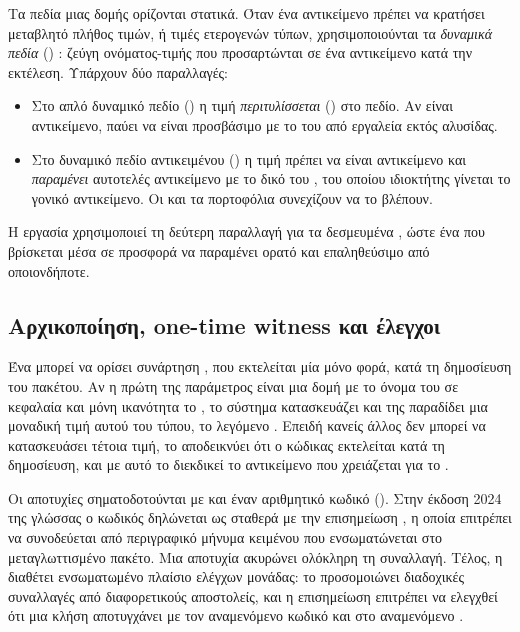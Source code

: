 Τα πεδία μιας δομής ορίζονται στατικά. Όταν ένα αντικείμενο πρέπει να κρατήσει μεταβλητό
πλήθος τιμών, ή τιμές ετερογενών τύπων, χρησιμοποιούνται τα \emph{δυναμικά πεδία}
() \cite{sui-dynamic-fields}: ζεύγη ονόματος-τιμής που προσαρτώνται σε
ένα αντικείμενο κατά την εκτέλεση. Υπάρχουν δύο παραλλαγές:

\begin{itemize}[nosep]
  \item Στο απλό δυναμικό πεδίο () η τιμή \emph{περιτυλίσσεται}
        () στο πεδίο. Αν είναι αντικείμενο, παύει να είναι προσβάσιμο με το
         του από εργαλεία εκτός αλυσίδας.
  \item Στο δυναμικό πεδίο αντικειμένου () η τιμή πρέπει να
        είναι αντικείμενο και \emph{παραμένει} αυτοτελές αντικείμενο με το δικό του
        , του οποίου ιδιοκτήτης γίνεται το γονικό αντικείμενο. Οι 
        και τα πορτοφόλια συνεχίζουν να το βλέπουν.
\end{itemize}

Η εργασία χρησιμοποιεί τη δεύτερη παραλλαγή για τα δεσμευμένα , ώστε ένα 
που βρίσκεται μέσα σε προσφορά να παραμένει ορατό και επαληθεύσιμο από οποιονδήποτε.

\subsection{Αρχικοποίηση, one-time witness και έλεγχοι}
\label{sec:otw}

Ένα  μπορεί να ορίσει συνάρτηση , που εκτελείται μία μόνο φορά, κατά
τη δημοσίευση του πακέτου. Αν η πρώτη της παράμετρος είναι μια δομή με το όνομα του
 σε κεφαλαία και μόνη ικανότητα το , το σύστημα κατασκευάζει και της
παραδίδει μια μοναδική τιμή αυτού του τύπου, το λεγόμενο .
Επειδή κανείς άλλος δεν μπορεί να κατασκευάσει τέτοια τιμή, το  αποδεικνύει ότι ο
κώδικας εκτελείται κατά τη δημοσίευση, και με αυτό το  διεκδικεί το αντικείμενο
 που χρειάζεται για το .

Οι αποτυχίες σηματοδοτούνται με  και έναν αριθμητικό κωδικό ().
Στην έκδοση 2024 της γλώσσας ο κωδικός δηλώνεται ως σταθερά με την επισημείωση
\code{\#[error]}, η οποία επιτρέπει να συνοδεύεται από περιγραφικό μήνυμα κειμένου που
ενσωματώνεται στο μεταγλωττισμένο πακέτο. Μια αποτυχία ακυρώνει ολόκληρη τη συναλλαγή.
Τέλος, η  διαθέτει ενσωματωμένο πλαίσιο ελέγχων μονάδας: το 
 προσομοιώνει διαδοχικές συναλλαγές από διαφορετικούς αποστολείς,
και η επισημείωση  επιτρέπει να ελεγχθεί ότι μια κλήση
αποτυγχάνει με τον αναμενόμενο κωδικό και στο αναμενόμενο .

